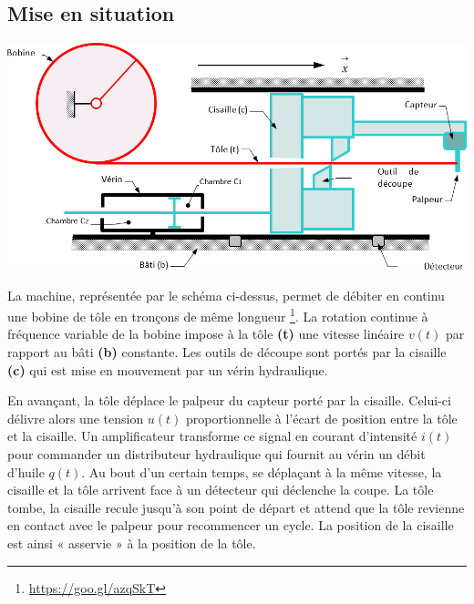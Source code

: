 \documentclass[10pt,fleqn]{article} %
\begin{document}
\def\pathfig{images}

\vspace{6cm}
\pagestyle{fancy}
\thispagestyle{plain}

\def\columnseprulecolor{\color{ocre}}
\setlength{\columnseprule}{0.4pt} 

\def\pathfig{images}

\begin{multicols}{2}
\section*{Mise en situation}
\ifprof
\else
\begin{center}
\includegraphics[width=\linewidth]{images/fig_01}
\end{center}

La machine, représentée par le schéma ci-dessus, permet de débiter en continu une bobine de tôle en tronçons de même longueur \footnote{
\url{https://goo.gl/azqSkT}}. La rotation continue à fréquence variable de la bobine impose à la tôle \textbf{(t)} une vitesse linéaire $v(t)$ par rapport au bâti \textbf{(b)} constante.
Les outils de découpe sont portés par la cisaille \textbf{(c)} qui est mise en mouvement par un vérin hydraulique.

En avançant, la tôle déplace le palpeur du capteur porté par la cisaille. Celui-ci délivre alors une tension $u(t)$ proportionnelle à l'écart de position entre la tôle et la cisaille. Un amplificateur transforme ce signal en courant d'intensité $i(t)$ pour commander un distributeur hydraulique qui fournit au vérin un débit d'huile $q(t)$. Au bout d'un certain temps, se déplaçant à la même vitesse, la cisaille et la tôle arrivent face à un détecteur qui déclenche la coupe. La tôle tombe, la cisaille recule jusqu'à son point de départ et attend que la tôle revienne en contact avec le palpeur pour recommencer un cycle. La position de la cisaille est ainsi « asservie » à la position de la tôle.


\end{multicols}
\end{document}
